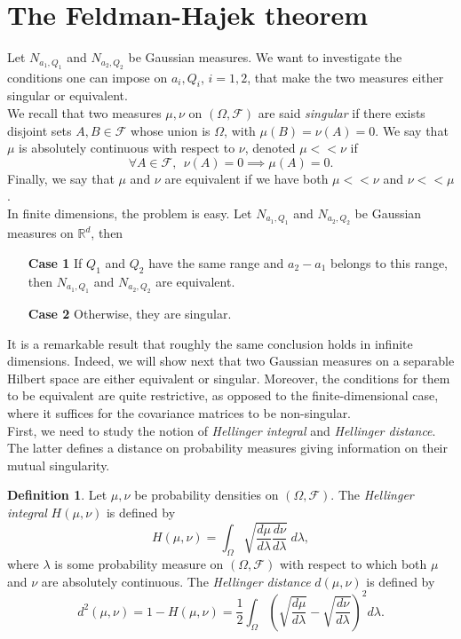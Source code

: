 \documentclass[10pt, a4paper]{report}
\newcommand{\R}[0]{\mathbb{R}}
\theoremstyle{definition}
\newtheorem{definition}{Definition}
\theoremstyle{remark}
\begin{document}
\section{The Feldman-Hajek theorem}
Let $N_{a_1,Q_1}$ and $N_{a_2,Q_2}$ be Gaussian measures. We want to investigate the conditions one can impose on $a_i, Q_i$, $i=1,2$, that make the two measures either singular or equivalent.\\ 
We recall that two measures $\mu,\nu$ on $(\Omega,\mathcal{F})$ are said \emph{singular} if there exists disjoint sets $A,B\in \mathcal{F}$ whose union is $\Omega$, with $\mu(B)=\nu(A)=0$. We say that $\mu$ is absolutely continuous with respect to $\nu$, denoted $\mu << \nu$ if 
$$\forall A \in \mathcal{F}, \ \ \nu(A) = 0 \implies \mu(A)=0.$$ 
Finally, we say that $\mu$ and $\nu$ are equivalent if we have both $\mu << \nu$ and $\nu << \mu$.\\
In finite dimensions, the problem is easy. Let $N_{a_1,Q_1}$ and $N_{a_2,Q_2}$ be Gaussian measures on $\R^d$, then
\begin{itemize}
	\item[\textbf{Case 1}] If $Q_1$ and $Q_2$ have the same range and $a_2-a_1$ belongs to this range, then $N_{a_1,Q_1}$ and $N_{a_2,Q_2}$ are equivalent.
	\item[\textbf{Case 2}] Otherwise, they are singular.
\end{itemize}
It is a remarkable result that roughly the same conclusion holds in infinite dimensions. Indeed, we will show next that two Gaussian measures on a separable Hilbert space are either equivalent or singular. Moreover, the conditions for them to be equivalent are quite restrictive, as opposed to the finite-dimensional case, where it suffices for the covariance matrices to be non-singular.\\
First, we need to study the notion of \emph{Hellinger integral} and \emph{Hellinger distance}. The latter defines a distance on probability measures giving information on their mutual singularity.
\begin{definition}
	Let $\mu,\nu$ be probability densities on $(\Omega,\mathcal{F})$. The \emph{Hellinger integral} $H(\mu,\nu)$ is defined by
	$$H(\mu,\nu) = \int_{\Omega} \sqrt{\frac{d\mu}{d\lambda}\frac{d\nu}{d\lambda}}\ d\lambda,$$
	where $\lambda$ is some probability measure on $(\Omega,\mathcal{F})$ with respect to which both $\mu$ and $\nu$ are absolutely continuous. The \emph{Hellinger distance} $d(\mu,\nu)$ is defined by 
	$$d^2(\mu,\nu) = 1-H(\mu,\nu)= \frac{1}{2}\int_\Omega \left(\sqrt{\frac{d\mu}{d\lambda}}-\sqrt{\frac{d\nu}{d\lambda}}\right)^2 d\lambda. $$
\end{definition}  
\end{document}
